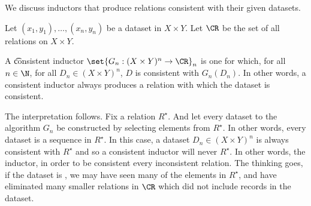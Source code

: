 

We discuss inductors that produce relations consistent with their given datasets.


Let $(x_1, y_1), \dots, (x_n, y_n)$ be a dataset in $X \times Y$.
Let $\CR$ be the set of all relations on $X \times Y$.

A \t{consistent inductor} $\set{G_n: (X \times Y)^n \to \CR}_{n}$ is one for which, for all $n \in \N$, for all $D_n \in (X \times Y)^n$, $D$ is consistent with $G_n(D_n)$.
In other words, a consistent inductor always produces a relation with which the dataset is consistent.

The interpretation follows.
Fix a relation $R^\star$.
And let every dataset  to the algorithm $G_n$ be constructed by selecting elements from $R^{\star}$.
In other words, every dataset is a sequence in $R^\star$.
In this case, a dataset $D_n \in (X \times Y)^n$ is always consistent with $R^\star$ and so a consistent inductor will never  $R^{\star}$.
In other words, the inductor, in order to be consistent  every inconsistent relation.
The thinking goes, if the dataset is , we may have seen many of the elements in $R^\star$, and have eliminated many smaller relations in $\CR$ which did not include records in the dataset.

\blankpage
